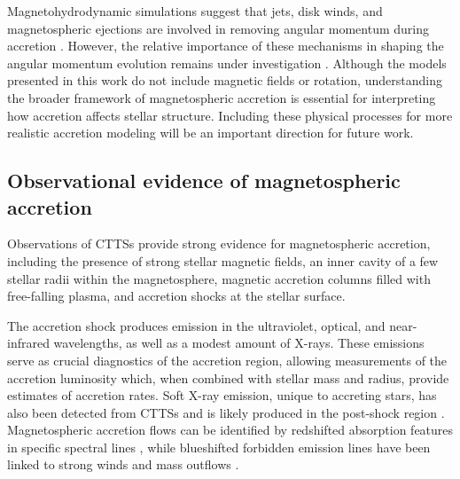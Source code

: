 \documentclass[12pt,a4paper]{article}
\begin{document}
Magnetohydrodynamic simulations suggest that jets, disk winds, and magnetospheric ejections are involved in removing angular momentum during accretion \parencite[e.g.,][]{RomanovaEtAl2004,LiiEtAl2014,IrelandEtAl2020}. However, the relative importance of these mechanisms in shaping the angular momentum evolution remains under investigation \parencite[e.g.,][]{KunitomoEtAl2017}. Although the models presented in this work do not include magnetic fields or rotation, understanding the broader framework of magnetospheric accretion is essential for interpreting how accretion affects stellar structure. Including these physical processes for more realistic accretion modeling will be an important direction for future work.

\subsection{Observational evidence of magnetospheric accretion}
\label{sec:obs_evidence}

Observations of CTTSs provide strong evidence for magnetospheric accretion, including the presence of strong stellar magnetic fields, an inner cavity of a few stellar radii within the magnetosphere, magnetic accretion columns filled with free-falling plasma, and accretion shocks at the stellar surface.

The accretion shock produces emission in the ultraviolet, optical, and near-infrared wavelengths, as well as a modest amount of X-rays. These emissions serve as crucial diagnostics of the accretion region, allowing measurements of the accretion luminosity which, when combined with stellar mass and radius, provide estimates of accretion rates. Soft X-ray emission, unique to accreting stars, has also been detected from CTTSs and is likely produced in the post-shock region \parencite[e.g.,][]{KastnerEtAl2002}. Magnetospheric accretion flows can be identified by redshifted absorption features in specific spectral lines \parencite{MuzerolleEtAl2001}, while blueshifted forbidden emission lines have been linked to strong winds and mass outflows \parencite[e.g.,][]{Bally2016}.

\end{document}
